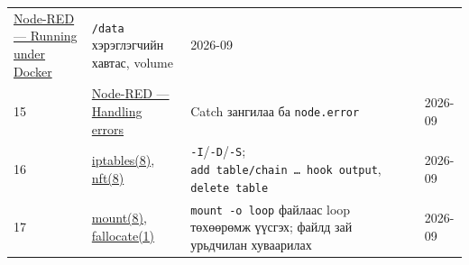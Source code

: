 \begin{longtable}[]{@{}llll@{}}
\begin{minipage}[t]{0.22\columnwidth}
\href{https://nodered.org/docs/getting-started/docker}{Node-RED --- Running under Docker}\strut
\end{minipage} & \begin{minipage}[t]{0.22\columnwidth}\raggedright
\texttt{/data} хэрэглэгчийн хавтас, volume\strut
\end{minipage} & \begin{minipage}[t]{0.22\columnwidth}\raggedright
2026-09\strut
\end{minipage}\tabularnewline
\begin{minipage}[t]{0.22\columnwidth}\raggedright
15\strut
\end{minipage} & \begin{minipage}[t]{0.22\columnwidth}\raggedright
\href{https://nodered.org/docs/user-guide/handling-errors}{Node-RED --- Handling errors}\strut
\end{minipage} & \begin{minipage}[t]{0.22\columnwidth}\raggedright
Catch зангилаа ба \texttt{node.error}\strut
\end{minipage} & \begin{minipage}[t]{0.22\columnwidth}\raggedright
2026-09\strut
\end{minipage}\tabularnewline
\begin{minipage}[t]{0.22\columnwidth}\raggedright
16\strut
\end{minipage} & \begin{minipage}[t]{0.22\columnwidth}\raggedright
\href{https://man7.org/linux/man-pages/man8/iptables.8.html}{iptables(8)}, \href{https://www.netfilter.org/projects/nftables/manpage.html}{nft(8)}\strut
\end{minipage} & \begin{minipage}[t]{0.22\columnwidth}\raggedright
\texttt{-I}/\allowbreak\texttt{-D}/\allowbreak\texttt{-S}; \texttt{add\ table/\allowbreak{}chain\ \ldots{}\ hook\ output}, \texttt{delete\ table}\strut
\end{minipage} & \begin{minipage}[t]{0.22\columnwidth}\raggedright
2026-09\strut
\end{minipage}\tabularnewline
\begin{minipage}[t]{0.22\columnwidth}\raggedright
17\strut
\end{minipage} & \begin{minipage}[t]{0.22\columnwidth}\raggedright
\href{https://man7.org/linux/man-pages/man8/mount.8.html}{mount(8)}, \href{https://man7.org/linux/man-pages/man1/fallocate.1.html}{fallocate(1)}\strut
\end{minipage} & \begin{minipage}[t]{0.22\columnwidth}\raggedright
\texttt{mount\ -o\ loop} файлаас loop төхөөрөмж үүсгэх; файлд зай урьдчилан хуваарилах\strut
\end{minipage} & \begin{minipage}[t]{0.22\columnwidth}\raggedright
2026-09\strut
\end{minipage}\tabularnewline
\bottomrule
\end{longtable}\endgroup
